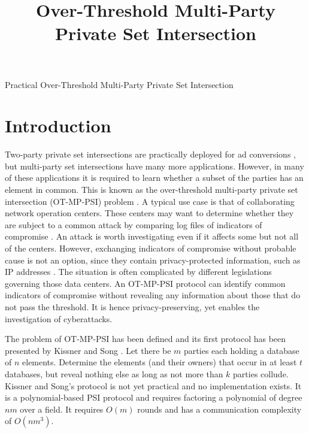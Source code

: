 \documentclass[10pt, sigconf]{acmart}
\title{Over-Threshold Multi-Party Private Set Intersection}
\date{}
\begin{document}
\pagestyle{plain} %
\onecolumn
\begingroup
\centering
{\Huge Practical Over-Threshold Multi-Party Private Set Intersection}\\[3em]
\endgroup

\section{Introduction}

Two-party private set intersections are practically deployed for ad conversions \cite{yung15mental}, but multi-party set intersections have many more applications.
However, in many of these applications it is required to learn whether a subset of the parties has an element in common.
This is known as the over-threshold multi-party private set intersection (OT-MP-PSI) problem \cite{Kissner}.
A typical use case is that of collaborating network operation centers.
These centers may want to determine whether they are subject to a common attack by comparing log files of indicators of compromise \cite{burger2014taxonomy}.
An attack is worth investigating even if it affects some but not all of the centers.
However, exchanging indicators of compromise without probable cause is not an option, since they contain privacy-protected information, such as IP addresses \cite{lah2008are}.
The situation is often complicated by different legislations governing those data centers.
An OT-MP-PSI protocol can identify common indicators of compromise without revealing any information about those that do not pass the threshold.
It is hence privacy-preserving, yet enables the investigation of cyberattacks.

The problem of OT-MP-PSI has been defined and its first protocol has been presented by Kissner and Song \cite{Kissner}.
Let there be $m$ parties each holding a database of $n$ elements.
Determine the elements (and their owners) that occur in at least $t$ databases, but reveal nothing else as long as not more than $k$ parties collude.
Kissner and Song's protocol is not yet practical and no implementation exists.
It is a polynomial-based PSI protocol and requires factoring a polynomial of degree $nm$ over a field.
It requires $O(m)$ rounds and has a communication complexity of $O(nm^3)$.
\end{document}
